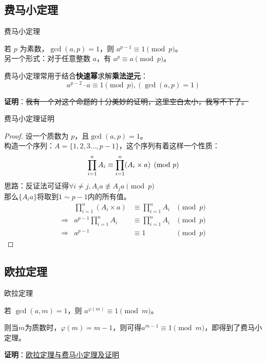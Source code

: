 \subsection{费马小定理}
\begin{frame}[fragile]{费马小定理}
  \begin{theorem}[费马小定理]
    若 $p$ 为素数，$\gcd(a, p) = 1$，则 $a^{p - 1} \equiv 1 \pmod{p}$。\\
    另一个形式：对于任意整数 $a$，有 $a^p \equiv a \pmod{p}$。
  \end{theorem}
  \pause 
  \vspace{0.5cm}

  费马小定理常用于结合\textbf{快速幂}求解\textbf{乘法逆元}：
  $$
  a^{p-2}\cdot a \equiv 1 \pmod{p}, (\gcd(a,p)=1)
  $$

  \pause
  \vspace{0.5cm}
  \textbf{证明}：\sout{我有一个对这个命题的十分美妙的证明，这里空白太小，我写不下了。}
\end{frame}

\begin{frame}[fragile]{费马小定理}{证明}
  \begin{proof}
    设一个质数为 $p$，且$\gcd(a,p)=1$。\\
    构造一个序列：$A=\{1,2,3\dots,p-1\}$，这个序列有着这样一个性质：
    $$
    \prod_{i=1}^{n}\space A_i\equiv\prod_{i=1}^{n} (A_i\times a) \pmod p
    $$
    思路：反证法可证得$\forall i\neq j,A_i a\not\equiv A_ja \pmod{p}$
    \\ 那么$\{A_ia\}$将取到$1\sim p-1$内的所有值。
    $$
    \begin{aligned}
      & \prod_{i=1}^{n}(A_i\times a) &\equiv\prod_{i=1}^{n} A_i &\pmod{p}\\
      \Rightarrow & a^{p-1}\prod_{i=1}^{n} A_i &\equiv\prod_{i=1}^{n} A_i &\pmod{p}\\
      \Rightarrow & a^{p-1} &\equiv 1 &\pmod{p}
    \end{aligned}
    $$
  \end{proof}
\end{frame}

\subsection{欧拉定理}
\begin{frame}[fragile]{欧拉定理}
  \begin{theorem}[欧拉定理]
    若 $\gcd(a, m) = 1$，则 $a^{\varphi(m)} \equiv 1 \pmod{m}$。
  \end{theorem}
  则当$m$为质数时，$\varphi(m)=m-1$，则可得$a^{m-1}\equiv 1 \pmod{m}$，即得到了费马小定理。
  
  \pause 
  \vspace{1.0cm}
  \textbf{证明}：\href{https://xdbirdie.github.io/2020/07/10/%E6%AC%A7%E6%8B%89%E5%AE%9A%E7%90%86%E4%B8%8E%E8%B4%B9%E9%A9%AC%E5%B0%8F%E5%AE%9A%E7%90%86/}{欧拉定理与费马小定理及证明}
\end{frame}

